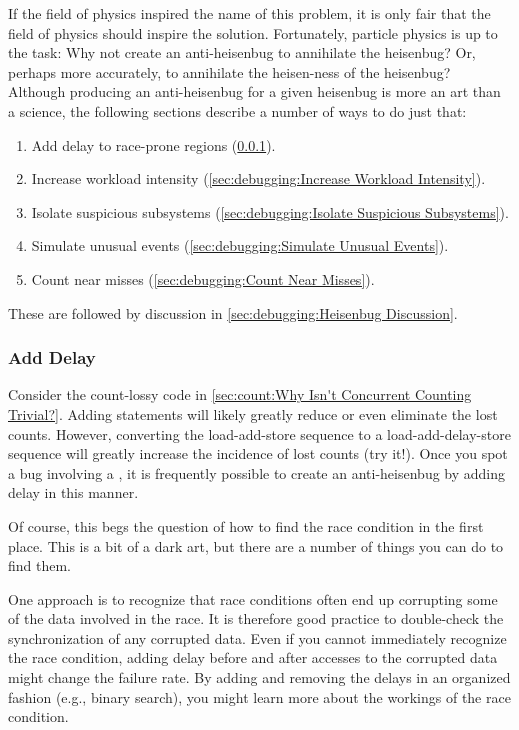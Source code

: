 If the field of physics inspired the name of this problem, it is only
fair that the field of physics should inspire the solution.
Fortunately, particle physics is up to the task:
Why not create an anti-heisenbug to annihilate the heisenbug?
Or, perhaps more accurately, to annihilate the heisen-ness of
the heisenbug?
Although producing an anti-heisenbug for a given heisenbug is more an
art than a science, the following sections describe a number of ways to
do just that:

\begin{enumerate}
\item	Add delay to race-prone regions (\cref{sec:debugging:Add Delay}).
\item	Increase workload intensity
	(\cref{sec:debugging:Increase Workload Intensity}).
\item	Isolate suspicious subsystems
	(\cref{sec:debugging:Isolate Suspicious Subsystems}).
\item	Simulate unusual events (\cref{sec:debugging:Simulate Unusual Events}).
\item	Count near misses (\cref{sec:debugging:Count Near Misses}).
\end{enumerate}

These are followed by discussion in
\cref{sec:debugging:Heisenbug Discussion}.

\subsubsection{Add Delay}
\label{sec:debugging:Add Delay}

Consider the count-lossy code in
\cref{sec:count:Why Isn't Concurrent Counting Trivial?}.
Adding  statements will likely greatly reduce or even
eliminate the lost counts.
However, converting the load-add-store sequence to a load-add-delay-store
sequence will greatly increase the incidence of lost counts (try it!).
Once you spot a bug involving a , it is frequently possible
to create an anti-heisenbug by adding delay in this manner.

Of course, this begs the question of how to find the race condition in
the first place.
This is a bit of a dark art, but there are a number of things you can
do to find them.

One approach is to recognize that race conditions often end up corrupting
some of the data involved in the race.
It is therefore good practice to double-check the synchronization of
any corrupted data.
Even if you cannot immediately recognize the race condition, adding
delay before and after accesses to the corrupted data might change
the failure rate.
By adding and removing the delays in an organized fashion (e.g., binary
search), you might learn more about the workings of the race condition.

